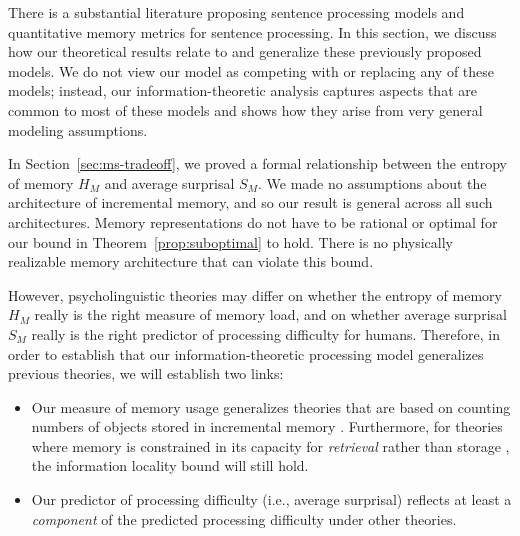 There is a substantial literature proposing sentence processing models and quantitative memory metrics for sentence processing.
In this section, we discuss how our theoretical results relate to and generalize these previously proposed models.
We do not view our model as competing with or replacing any of these models; instead, our information-theoretic analysis captures aspects that are common to most of these models and shows how they arise from very general modeling assumptions. 

In Section~\ref{sec:ms-tradeoff}, we proved a formal relationship between the entropy of memory $H_M$ and average surprisal $S_M$. 
We made no assumptions about the architecture of incremental memory, and so our result is general across all such architectures.
Memory representations do not have to be rational or optimal for our bound in Theorem~\ref{prop:suboptimal} to hold.
There is no physically realizable memory architecture that can violate this bound.

However, psycholinguistic theories may differ on whether the entropy of memory $H_M$ really is the right measure of memory load, and on whether average surprisal $S_M$ really is the right predictor of processing difficulty for humans. Therefore, in order to establish that our information-theoretic processing model generalizes previous theories, we will establish two links:
\begin{itemize}
    \item Our measure of memory usage generalizes theories that are based on counting numbers of objects stored in incremental memory \citep[e.g.,][]{yngve1960model,miller-finitary-1963,frazier1985syntactic,gibson-linguistic-1998,kobele2013memory,graf2014evaluating,GrafEtAl15MOL,gerth2015memory,GrafEtAl17JLM,desanto2020parsing}. Furthermore, for theories where memory is constrained in its capacity for \emph{retrieval} rather than storage \citep[e.g.,][]{mcelree-memory-2003,lewis-activation-based-2005}, the information locality bound will still hold.
    \item Our predictor of processing difficulty (i.e., average surprisal) reflects at least a \emph{component} of the predicted processing difficulty under other theories.
\end{itemize}

